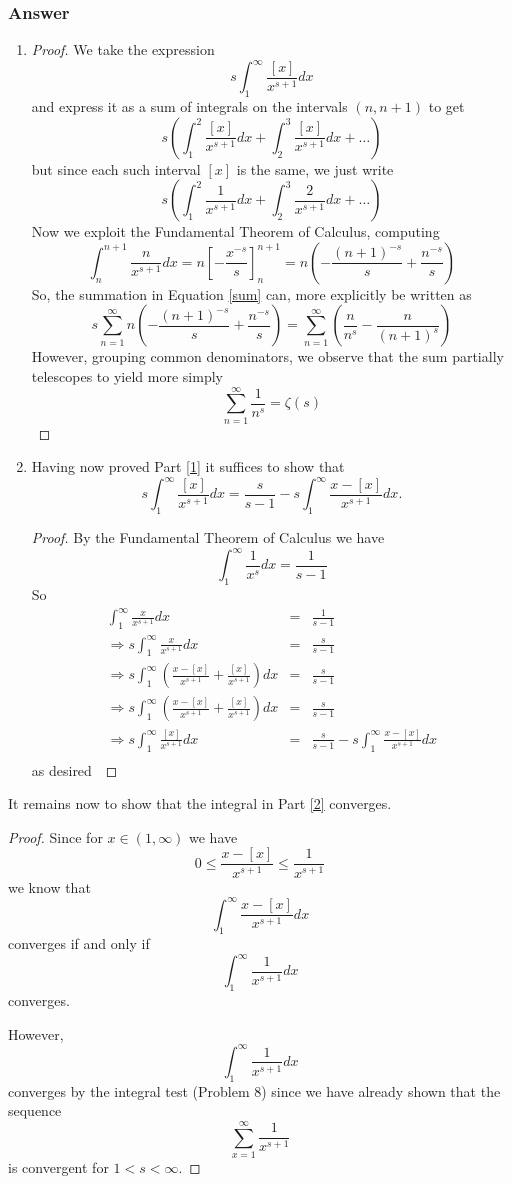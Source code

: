 \documentclass[12pt]{article}
\begin{document}
\subsubsection{Answer}
\begin{enumerate}
\item \begin{proof} We take the expression
\[s \int_1^\infty \frac{[x]}{x^{s+1}} dx\]
and express it as a sum of integrals on the intervals $(n,n+1)$ to get
\[s \left( \int_1^2 \frac{[x]}{x^{s+1}} dx + \int_2^3 \frac{[x]}{x^{s+1}} dx + \dots  \right) \]
but since each such interval $[x]$ is the same, we just write
\begin{equation}\label{sum}s \left( \int_1^2 \frac{1}{x^{s+1}} dx + \int_2^3 \frac{2}{x^{s+1}} dx + \dots  \right) \end{equation}
Now we exploit the Fundamental Theorem of Calculus, computing
\[\int_n^{n+1} \frac{n}{x^{s+1}} dx= n \left[ -\frac{x^{-s}}{s} \right]_n^{n+1}=n \left( -\frac{(n+1)^{-s}}{s} +\frac{n^{-s}}{s}\right)\]
So, the summation in Equation \ref{sum} can, more explicitly be written as 
\[ s \sum_{n=1}^\infty n \left( -\frac{(n+1)^{-s}}{s} +\frac{n^{-s}}{s}\right)= \sum_{n=1}^\infty  \left( \frac{n}{n^{s}} -\frac{n}{(n+1)^{s}} \right)\]
However, grouping common denominators, we observe that the sum partially telescopes to yield more simply
\[\sum_{n=1}^\infty \frac{1}{n^s}= \zeta(s)\]\end{proof}
\item Having now proved  Part \ref{1} it suffices to show that 
 \[ s \int_1^\infty \frac{[x]}{x^{s+1}} dx = \frac{s}{s-1} - s \int_1^\infty \frac{x-[x]}{x^{s+1}} dx.\]
\begin{proof} 
By the Fundamental Theorem of Calculus we have
\[\int_1^\infty \frac{1}{x^s} dx=\frac{1}{s-1}\]
So
\begin{eqnarray*}
\int_1^\infty \frac{x}{x^{s+1}} dx&=&\frac{1}{s-1}\\
\Rightarrow s \int_1^\infty \frac{x}{x^{s+1}} dx&=&\frac{s}{s-1}\\
\Rightarrow s \int_1^\infty \left( \frac{x-[x]}{x^{s+1}} + \frac{[x]}{x^{s+1}} \right) dx&=&\frac{s}{s-1}\\
\Rightarrow s \int_1^\infty \left( \frac{x-[x]}{x^{s+1}} + \frac{[x]}{x^{s+1}} \right) dx&=&\frac{s}{s-1}\\
\Rightarrow s \int_1^\infty  \frac{[x]}{x^{s+1}} dx &=&\frac{s}{s-1} -  s \int_1^\infty  \frac{x-[x]}{x^{s+1}} dx\\
\end{eqnarray*}
as desired\ \end{proof}
 \end{enumerate}
It remains now to show that the integral in Part \ref{2} converges.
\begin{proof}
Since for $x \in (1,\infty)$ we have
\[0 \leq  \frac{x-[x]}{x^{s+1}} \leq \frac{1}{x^{s+1}}\]
we know that
\[\int_1^\infty \frac{x-[x]}{x^{s+1}} dx\]
converges if and only if
\[\int_1^\infty \frac{1}{x^{s+1}} dx\]
converges.

However, 
\[\int_1^\infty \frac{1}{x^{s+1}} dx\]
converges by the integral test (Problem 8) since we have already shown that the sequence
\[\sum_{x=1}^\infty \frac{1}{x^{s+1}}\]
is convergent for $1<s<\infty$.\end{proof}
\end{document}
